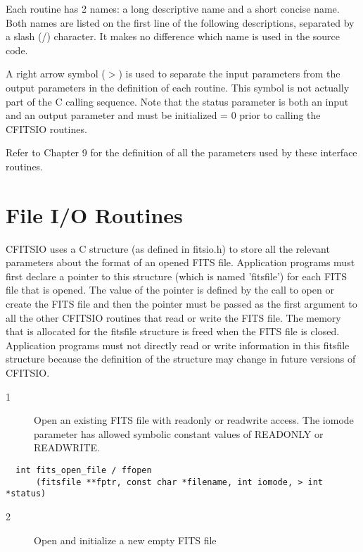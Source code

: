 Each routine has 2 names: a long descriptive
name and a short concise name.  Both names are listed on the first
line of the following descriptions, separated by a slash (/) character.
It makes no difference which name is used in the source code.

A right arrow symbol ($>$) is used to separate the input parameters from
the output parameters in the  definition of each routine.  This symbol
is not actually part of the C calling sequence.  Note that
the status parameter is both an input and an output parameter
and must be initialized = 0 prior to calling the CFITSIO routines.

Refer to Chapter 9 for the definition of all the parameters
used by these interface routines.


\section{File I/O Routines}

CFITSIO uses a C structure (as defined in fitsio.h) to store all the
relevant parameters about the format of an opened FITS file.
Application programs must first declare a pointer to this structure
(which is named 'fitsfile') for each FITS file that is opened.  The
value of the pointer is defined by the call to open or create the FITS
file and then the pointer must be passed as the first argument to all
the other CFITSIO routines that read or write the FITS file.  The
memory that is allocated for the fitsfile structure is freed when
the FITS file is closed.  Application programs must not directly
read or write information in this fitsfile structure because
the definition of the structure may change in future versions of
CFITSIO.


\begin{description}
\item[1 ] Open an existing FITS file with readonly or readwrite access.
    The iomode parameter has allowed symbolic constant values of
   READONLY or READWRITE.
\end{description}

\begin{verbatim}
  int fits_open_file / ffopen
      (fitsfile **fptr, const char *filename, int iomode, > int *status)
\end{verbatim}

\begin{description}
\item[2 ] Open and initialize a new empty FITS file
\end{description}

